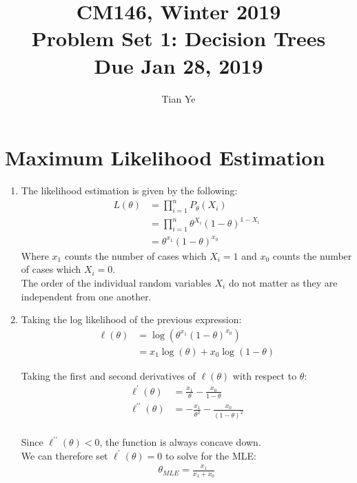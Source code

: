 \documentclass[11pt]{article}
\newcommand{\cnum}{CM146}
\newcommand{\ced}{Winter 2019}
\newcommand{\ctitle}[3]{\title{\vspace{-0.5in}\cnum, \ced\\Problem Set #1: #2\\Due #3}}
\newcommand{\solution}[1]{{{\color{blue}{\bf Solution:} {#1}}}}
\begin{document}
\ctitle{1}{Decision Trees}{Jan 28, 2019}
\author{Tian Ye}
\maketitle

\newpage

\section{Maximum Likelihood Estimation}
\begin{enumerate}
\item 

\solution{
The likelihood estimation is given by the following:
\begin{align}
L(\theta) &= \prod_{i=1}^{n} P_{\theta}(X_{i}) \\
	     &= \prod_{i=1}^{n} \theta^{X_{i}}(1-\theta)^{1-X_{i}} \\
	     &= \theta^{x_{1}}(1-\theta)^{x_{0}}
\end{align}
Where $x_{1}$ counts the number of cases which $X_{i} = 1$ and  $x_{0}$ counts the number of cases which $X_{i} = 0$. \\
The order of the individual random variables $X_{i}$ do not matter as they are independent from one another.
}

\vspace{1cm}

\item
\solution{
Taking the log likelihood of the previous expression:
\begin{align}
\ell(\theta) &= \log(\theta^{x_{1}}(1-\theta)^{x_{0}}) \\
                  &= x_{1}\log(\theta) + x_{0}\log(1-\theta)
\end{align}

Taking the first and second derivatives of $\ell(\theta)$ with respect to $\theta$:
\begin{align}
\ell^{\prime}(\theta) &= \frac{x_{1}}{\theta} - \frac{x_{0}}{1-\theta}\\
\ell^{\prime\prime}(\theta) &= -\frac{x_{1}}{\theta^2} - \frac{x_{0}}{(1-\theta)^2}\\
\end{align}

Since $\ell^{\prime\prime}(\theta) < 0$, the function is always concave down. \\
We can therefore set $\ell^{\prime}(\theta) = 0$ to solve for the MLE:
\begin{align}
\theta_{MLE} = \frac{x_1}{x_{1}+x_0}
\end{align}
}
\newpage



\end{enumerate}
\end{document}
